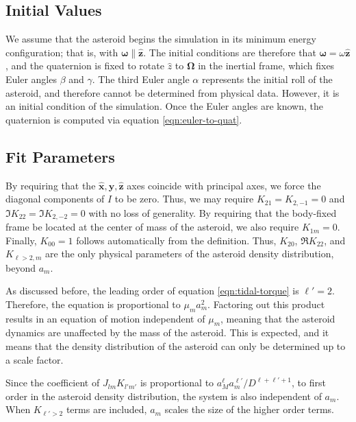 \documentclass[linenumbers]{aastex631}
\newcommand{\unit}[1]{\hat{\mathbf{#1}}}
\begin{document}
\subsection{Initial Values}
We assume that the asteroid begins the simulation in its minimum energy configuration; that is, with $\mathbf \omega \parallel \unit z$. The initial conditions are therefore that $\mathbf \omega = \omega \unit z$, and the quaternion is fixed to rotate $\hat z$ to $\mathbf \Omega$ in the inertial frame, which fixes Euler angles $\beta$ and $\gamma$. The third Euler angle $\alpha$ represents the initial roll of the asteroid, and therefore cannot be determined from physical data. However, it is an initial condition of the simulation. Once the Euler angles are known, the quaternion is computed via equation \ref{eqn:euler-to-quat}.


\subsection{Fit Parameters}
By requiring that the $\unit x, \unit y, \unit z$ axes coincide with principal axes, we force the diagonal components of $I$ to be zero. Thus, we may require $K_{21}=K_{2,-1}=0$ and $\Im K_{22}=\Im K_{2,-2}=0$ with no loss of generality. By requiring that the body-fixed frame be located at the center of mass of the asteroid, we also require $K_{1m}=0$. Finally, $K_{00}=1$ follows automatically from the definition. Thus, $K_{20}$, $\Re K_{22}$, and $K_{\ell>2, m}$ are the only physical parameters of the asteroid density distribution, beyond $a_m$.

As discussed before, the leading order of equation \ref{eqn:tidal-torque} is $\ell' = 2$. Therefore, the equation is proportional to $\mu_m a_m^2$. Factoring out this product results in an equation of motion independent of $\mu_m$, meaning that the asteroid dynamics are unaffected by the mass of the asteroid. This is expected, and it means that the density distribution of the asteroid can only be determined up to a scale factor.

Since the coefficient of $J_{lm}K_{l'm'}$ is proportional to $a_M^\ell a_m^{\ell'} / D^{\ell+\ell'+1}$, to first order in the asteroid density distribution, the system is also independent of $a_m$. When $K_{\ell' > 2}$ terms are included, $a_m$ scales the size of the higher order terms.
\end{document}
